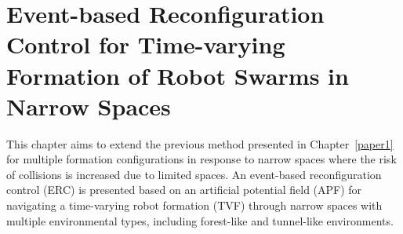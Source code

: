 \chapter{Event-based Reconfiguration Control for Time-varying Formation of Robot Swarms in Narrow Spaces}\label{paper2}

\vspace{1cm}



This chapter aims to extend the previous method presented in Chapter~\ref{paper1} for multiple formation configurations in response to narrow spaces where the risk of collisions is increased due to limited spaces. An event-based reconfiguration control (ERC) is presented based on an artificial potential field (APF) for navigating a time-varying robot formation (TVF) through narrow spaces with multiple environmental types, including forest-like and tunnel-like environments.







